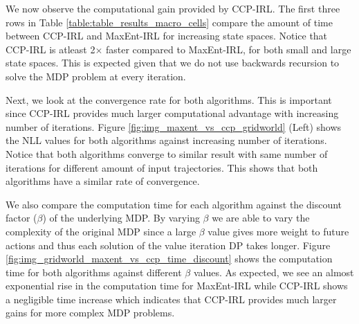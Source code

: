 \documentclass{article}
\begin{document}
We now observe the computational gain provided by CCP-IRL. The first three rows in Table \ref{table:table_results_macro_cells} compare the amount of time between CCP-IRL and MaxEnt-IRL for increasing state spaces.
Notice that CCP-IRL is atleast 2$\times$ faster compared to MaxEnt-IRL, for both small and large state spaces. This is expected given that we do not use backwards recursion to solve the MDP problem at every iteration.
    
Next, we look at the convergence rate for both algorithms. This is important since CCP-IRL provides much larger computational advantage with increasing number of iterations. 
Figure \ref{fig:img_maxent_vs_ccp_gridworld} (Left) shows the NLL values for both algorithms against increasing number of iterations.
Notice that both algorithms converge to similar result with same number of iterations for different amount of input trajectories. This shows that both algorithms have a similar rate of convergence.

We also compare the computation time for each algorithm against the discount factor ($\beta$) of the underlying MDP. By varying $\beta$ we are able to vary the complexity of the original MDP since a large $\beta$ value gives more weight to future actions and thus each solution of the value iteration DP takes longer.
Figure \ref{fig:img_gridworld_maxent_vs_ccp_time_discount} shows the computation time for both algorithms against different $\beta$ values. As expected, we see an almost exponential rise in the computation time for MaxEnt-IRL while CCP-IRL shows a negligible time increase which indicates that CCP-IRL provides much larger gains for more complex MDP problems. 
\end{document}

